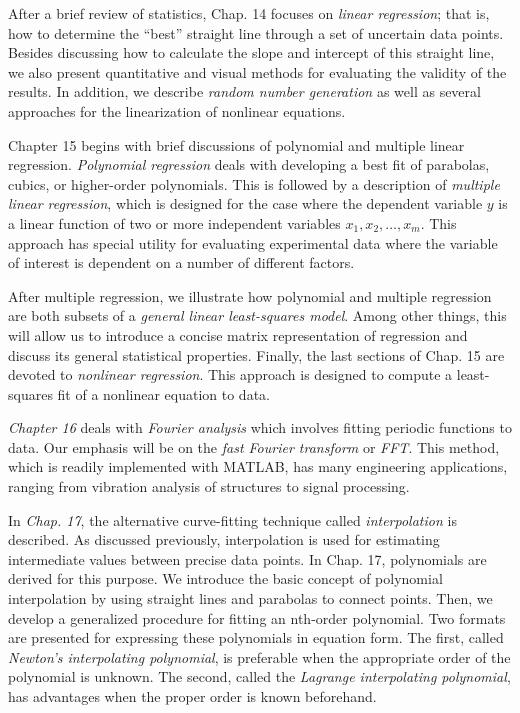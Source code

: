 \documentclass[../main.tex]{subfiles}
\begin{document}
\noindent After a brief review of statistics, Chap. 14 focuses on \textit{linear regression}; that is, how to determine the ``best'' straight line through a set of uncertain data points. Besides discussing how to
calculate the slope and intercept of this straight line, we also present quantitative and visual
methods for evaluating the validity of the results. In addition, we describe \textit{random number
generation} as well as several approaches for the linearization of nonlinear equations.

Chapter 15 begins with brief discussions of polynomial and multiple linear regression.
\textit{Polynomial regression} deals with developing a best fit of parabolas, cubics, or higher-order
polynomials. This is followed by a description of \textit{multiple linear regression}, which is designed for the case where the dependent variable $y$ is a linear function of two or more
independent variables $x_1, x_2, \dots , x_m$. This approach has special utility for evaluating experimental data where the variable of interest is dependent on a number of different factors.

After multiple regression, we illustrate how polynomial and multiple regression are
both subsets of a \textit{general linear least-squares model}. Among other things, this will allow
us to introduce a concise matrix representation of regression and discuss its general statistical properties. Finally, the last sections of Chap. 15 are devoted to \textit{nonlinear regression}.
This approach is designed to compute a least-squares fit of a nonlinear equation to data.

\textit{Chapter 16} deals with \textit{Fourier analysis} which involves fitting periodic functions to
data. Our emphasis will be on the \textit{fast Fourier transform} or \textit{FFT}. This method, which is
readily implemented with MATLAB, has many engineering applications, ranging from
vibration analysis of structures to signal processing.

In \textit{Chap. 17}, the alternative curve-fitting technique called \textit{interpolation} is described.
As discussed previously, interpolation is used for estimating intermediate values between
precise data points. In Chap. 17, polynomials are derived for this purpose. We introduce the
basic concept of polynomial interpolation by using straight lines and parabolas to connect
points. Then, we develop a generalized procedure for fitting an nth-order polynomial. Two
formats are presented for expressing these polynomials in equation form. The first, called
\textit{Newton's interpolating polynomial}, is preferable when the appropriate order of the polynomial is unknown. The second, called the \textit{Lagrange interpolating polynomial}, has advantages when the proper order is known beforehand.
\end{document}
